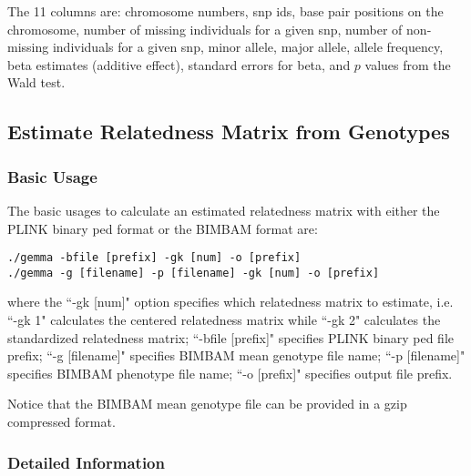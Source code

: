 \documentclass[11pt]{article}
\begin{document}
The 11 columns are: chromosome numbers, snp ids, base pair positions
on the chromosome, number of missing individuals for a given snp,
number of non-missing individuals for a given snp, minor allele, major
allele, allele frequency, beta estimates (additive effect), standard
errors for beta, and $p$ values from the Wald test.

\subsection{Estimate Relatedness Matrix from Genotypes}

\subsubsection{Basic Usage}

The basic usages to calculate an estimated relatedness matrix with
either the PLINK binary ped format or the BIMBAM format are:
%
\begin{verbatim}
./gemma -bfile [prefix] -gk [num] -o [prefix]
./gemma -g [filename] -p [filename] -gk [num] -o [prefix]
\end{verbatim}
%
where the ``-gk [num]" option specifies which relatedness matrix to
estimate, i.e. ``-gk 1" calculates the centered relatedness matrix
while ``-gk 2" calculates the standardized relatedness matrix;
``-bfile [prefix]" specifies PLINK binary ped file prefix; ``-g
[filename]" specifies BIMBAM mean genotype file name; ``-p [filename]"
specifies BIMBAM phenotype file name; ``-o [prefix]" specifies output
file prefix.

Notice that the BIMBAM mean genotype file can be provided in a gzip
compressed format.

\subsubsection{Detailed Information}
\end{document}
